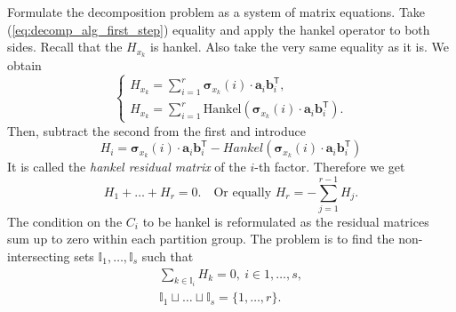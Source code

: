 \documentclass[referee, pdflatex, sn-mathphys-num]{sn-jnl}
\theoremstyle{definition}
\theoremstyle{plain}
\begin{document}
	Formulate the decomposition problem as a system of matrix equations. Take (\ref{eq:decomp_alg_first_step}) equality and apply the hankel operator to both sides. Recall that the $ H_{x_k} $ is hankel. Also take the very same equality as it is. We obtain \begin{equation*}
		\begin{cases*}
			H_{x_k} = \sum\limits_{i = 1}^{r} \boldsymbol{\sigma}_{x_k}(i) \cdot \mathbf{a}_i  \mathbf{b}_i^{\mathsf{T}}, \\
			H_{x_k} = \sum\limits_{i = 1}^{r} \text{Hankel}(\boldsymbol{\sigma}_{x_k}(i) \cdot \mathbf{a}_i  \mathbf{b}_i^{\mathsf{T}}).
		\end{cases*}
	\end{equation*}	Then, subtract the second from the first and introduce \begin{equation}\label{eq:hankel_resid_matrix}
		H_i = \boldsymbol{\sigma}_{x_k}(i) \cdot \mathbf{a}_i  \mathbf{b}_i^{\mathsf{T}} - Hankel(\boldsymbol{\sigma}_{x_k}(i) \cdot \mathbf{a}_i  \mathbf{b}_i^{\mathsf{T}})
	\end{equation}	It is called the \emph{hankel residual matrix} of the $ i $-th factor. Therefore we get \begin{equation}\label{eq:residuals_equation}
		H_1 + \ldots + H_r = 0. \quad \text{Or equally } H_r = - \sum\limits_{j = 1}^{r - 1} H_j.
	\end{equation} The condition on the $ C_i $ to be hankel is reformulated as the residual matrices sum up to zero within each partition group. The problem is to find the non-intersecting sets $ \mathbb{I}_1, \ldots , \mathbb{I}_s $ such that	\begin{gather}\label{eq:decomp_opt_init}
		\sum_{k \in \mathbb{I}_i} H_k = 0, \ i \in 1, \ldots, s , \\
		\mathbb{I}_1 \sqcup \ldots \sqcup \mathbb{I}_s = \{1, \ldots, r\} . \nonumber
	\end{gather}
	
\end{document}
